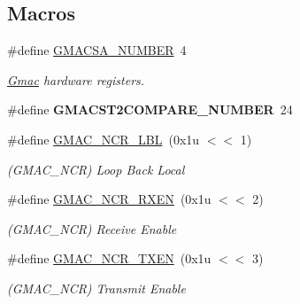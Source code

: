 \subsection*{Macros}
\begin{DoxyCompactItemize}
\item 
\mbox{\label{group__SAME70__GMAC_gaa647e0e4433f73db7438443c6d90aadb}} 
\#define \mbox{\hyperlink{group__SAME70__GMAC_gaa647e0e4433f73db7438443c6d90aadb}{G\+M\+A\+C\+S\+A\+\_\+\+N\+U\+M\+B\+ER}}~4
\begin{DoxyCompactList}\small\item\em \mbox{\hyperlink{structGmac}{Gmac}} hardware registers. \end{DoxyCompactList}\item 
\mbox{\label{group__SAME70__GMAC_gaecc0163d037f0e089dbb037719862bc2}} 
\#define {\bfseries G\+M\+A\+C\+S\+T2\+C\+O\+M\+P\+A\+R\+E\+\_\+\+N\+U\+M\+B\+ER}~24
\item 
\mbox{\label{group__SAME70__GMAC_ga755eb1962a4bfcf8785af7ffda9a10de}} 
\#define \mbox{\hyperlink{group__SAME70__GMAC_ga755eb1962a4bfcf8785af7ffda9a10de}{G\+M\+A\+C\+\_\+\+N\+C\+R\+\_\+\+L\+BL}}~(0x1u $<$$<$ 1)
\begin{DoxyCompactList}\small\item\em (G\+M\+A\+C\+\_\+\+N\+CR) Loop Back Local \end{DoxyCompactList}\item 
\mbox{\label{group__SAME70__GMAC_gacb35b345b04d2c77ef252c03146794a3}} 
\#define \mbox{\hyperlink{group__SAME70__GMAC_gacb35b345b04d2c77ef252c03146794a3}{G\+M\+A\+C\+\_\+\+N\+C\+R\+\_\+\+R\+X\+EN}}~(0x1u $<$$<$ 2)
\begin{DoxyCompactList}\small\item\em (G\+M\+A\+C\+\_\+\+N\+CR) Receive Enable \end{DoxyCompactList}\item 
\mbox{\label{group__SAME70__GMAC_ga69039c870c224c221b1c6b2f70aab80d}} 
\#define \mbox{\hyperlink{group__SAME70__GMAC_ga69039c870c224c221b1c6b2f70aab80d}{G\+M\+A\+C\+\_\+\+N\+C\+R\+\_\+\+T\+X\+EN}}~(0x1u $<$$<$ 3)
\begin{DoxyCompactList}\small\item\em (G\+M\+A\+C\+\_\+\+N\+CR) Transmit Enable \end{DoxyCompactList}\item 
$$
\end{DoxyCompactItemize}
